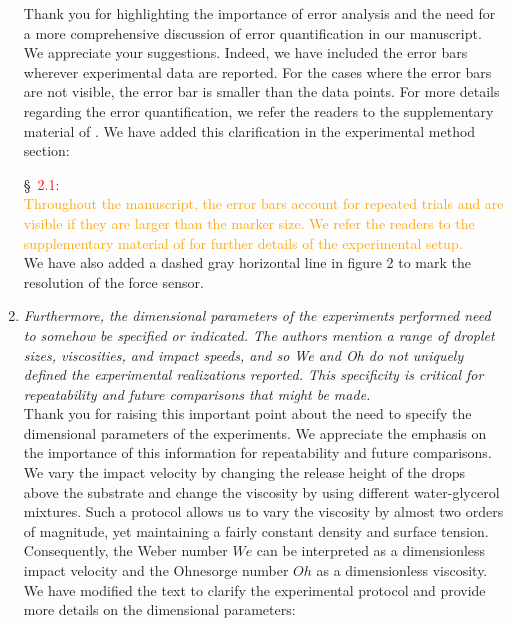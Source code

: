 \documentclass[]{article}
\newcommand*\red{\textcolor{red}}
\newcommand{\VS}[1]{{\textcolor{orange}{#1}}}
\begin{document}
\begin{enumerate}
	Thank you for highlighting the importance of error analysis and the need for a more comprehensive discussion of error quantification in our manuscript. We appreciate your suggestions. Indeed, we have included the error bars wherever experimental data are reported. For the cases where the error bars are not visible, the error bar is smaller than the data points. For more details regarding the error quantification, we refer the readers to the supplementary material of \citet{zhang2022impact}. We have added this clarification in the experimental method section:
	
	\S~\red{2.1:}\\
	\VS{Throughout the manuscript, the error bars account for repeated trials and are visible if they are larger than the marker size. We refer the readers to the supplementary material of \citet{zhang2022impact} for further details of the experimental setup.}\\[0.5mm]
	
	We have also added a dashed gray horizontal line in figure 2 to mark the resolution of the force sensor. 
	
	\item \textit{Furthermore, the dimensional parameters of the experiments performed need to somehow be specified or indicated. The authors mention a range of droplet sizes, viscosities, and impact speeds, and so We and Oh do not uniquely defined the experimental realizations reported. This specificity is critical for repeatability and future comparisons that might be made.}\\[0.5mm]
	
	Thank you for raising this important point about the need to specify the dimensional parameters of the experiments. We appreciate the emphasis on the importance of this information for repeatability and future comparisons. We vary the impact velocity by changing the release height of the drops above the substrate and change the viscosity by using different water-glycerol mixtures. Such a protocol allows us to vary the viscosity by almost two orders of magnitude, yet maintaining a fairly constant density and surface tension. Consequently, the Weber number $We$ can be interpreted as a dimensionless impact velocity and the Ohnesorge number $Oh$ as a dimensionless viscosity. We have modified the text to clarify the experimental protocol and provide more details on the dimensional parameters:
	

\end{enumerate}
\end{document}
